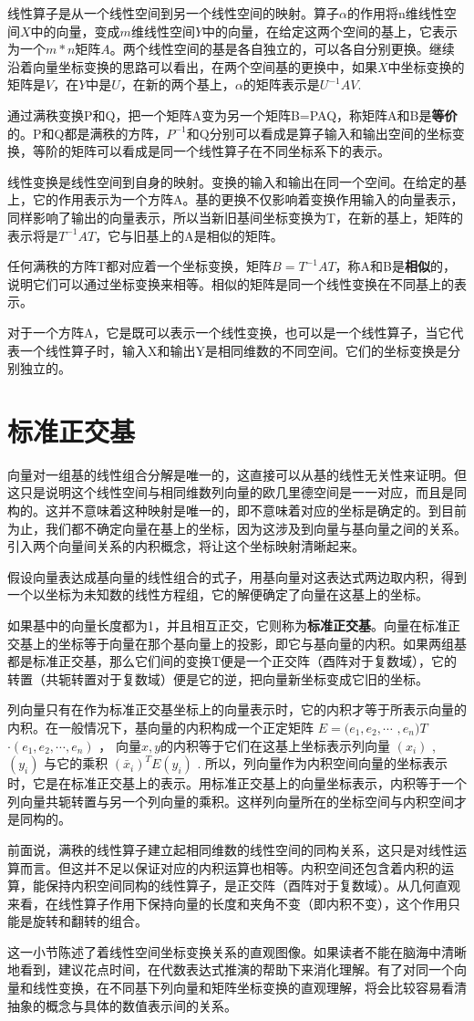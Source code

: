 线性算子是从一个线性空间到另一个线性空间的映射。算子$ \alpha $的作用将$  $n维线性空间$ X $中的向量，变成$ m $维线性空间$ Y $中的向量，在给定这两个空间的基上，它表示为一个$ m*n $矩阵$ A $。两个线性空间的基是各自独立的，可以各自分别更换。继续沿着向量坐标变换的思路可以看出，在两个空间基的更换中，如果$ X $中坐标变换的矩阵是$ V $，在$ Y $中是$ U $，在新的两个基上，$ \alpha $的矩阵表示是$ U^{-1}AV $.

通过满秩变换P和Q，把一个矩阵A变为另一个矩阵B=PAQ，称矩阵A和B是\textbf{等价}的。P和Q都是满秩的方阵，$ P^{-1} $和Q分别可以看成是算子输入和输出空间的坐标变换，等阶的矩阵可以看成是同一个线性算子在不同坐标系下的表示。

线性变换是线性空间到自身的映射。变换的输入和输出在同一个空间。在给定的基上，它的作用表示为一个方阵A。基的更换不仅影响着变换作用输入的向量表示，同样影响了输出的向量表示，所以当新旧基间坐标变换为T，在新的基上，矩阵的表示将是$ T^{-1}AT $，它与旧基上的A是相似的矩阵。

任何满秩的方阵T都对应着一个坐标变换，矩阵$ B=T^{-1}AT $，称A和B是\textbf{相似}的，说明它们可以通过坐标变换来相等。相似的矩阵是同一个线性变换在不同基上的表示。

对于一个方阵A，它是既可以表示一个线性变换，也可以是一个线性算子，当它代表一个线性算子时，输入X和输出Y是相同维数的不同空间。它们的坐标变换是分别独立的。

\section{标准正交基}

向量对一组基的线性组合分解是唯一的，这直接可以从基的线性无关性来证明。但这只是说明这个线性空间与相同维数列向量的欧几里德空间是一一对应，而且是同构的。这并不意味着这种映射是唯一的，即不意味着对应的坐标是确定的。到目前为止，我们都不确定向量在基上的坐标，因为这涉及到向量与基向量之间的关系。引入两个向量间关系的内积概念，将让这个坐标映射清晰起来。

假设向量表达成基向量的线性组合的式子，用基向量对这表达式两边取内积，得到一个以坐标为未知数的线性方程组，它的解便确定了向量在这基上的坐标。

如果基中的向量长度都为1，并且相互正交，它则称为\textbf{标准正交基}。向量在标准正交基上的坐标等于向量在那个基向量上的投影，即它与基向量的内积。如果两组基都是标准正交基，那么它们间的变换T便是一个正交阵（酉阵对于复数域），它的转置（共轭转置对于复数域）便是它的逆，把向量新坐标变成它旧的坐标。

列向量只有在作为标准正交基坐标上的向量表示时，它的内积才等于所表示向量的内积。在一般情况下，基向量的内积构成一个正定矩阵 $ E = ( e_1, e_2, \cdots$  $, e_n )$$  T $ $ \cdot(e_1,e_2,\cdots,e_n) $ ，
向量$ x, y $的内积等于它们在这基上坐标表示列向量 $ (x_i)$ ,  $(y_i) $ 与它的乘积 $(\bar{x}_i)^TE(y_i) $ . 所以，列向量作为内积空间向量的坐标表示时，它是在标准正交基上的表示。用标准正交基上的向量坐标表示，内积等于一个列向量共轭转置与另一个列向量的乘积。这样列向量所在的坐标空间与内积空间才是同构的。

前面说，满秩的线性算子建立起相同维数的线性空间的同构关系，这只是对线性运算而言。但这并不足以保证对应的内积运算也相等。内积空间还包含着内积的运算，能保持内积空间同构的线性算子，是正交阵（酉阵对于复数域）。从几何直观来看，在线性算子作用下保持向量的长度和夹角不变（即内积不变），这个作用只能是旋转和翻转的组合。

这一小节陈述了着线性空间坐标变换关系的直观图像。如果读者不能在脑海中清晰地看到，建议花点时间，在代数表达式推演的帮助下来消化理解。有了对同一个向量和线性变换，在不同基下列向量和矩阵坐标变换的直观理解，将会比较容易看清抽象的概念与具体的数值表示间的关系。
